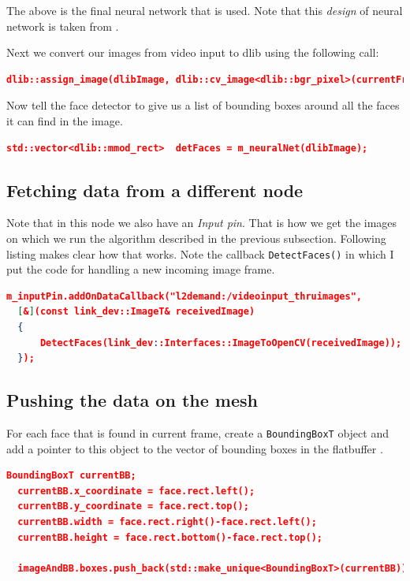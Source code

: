 \documentclass[a4paper, 12pt, oneside]{report}
\begin{document}
  The above is the final neural network that is used. Note that this \textit{design} of neural network is taken from \cite{king2015max}.
  
  Next we convert our images from video input to dlib using the following call:
  \begin{lstlisting}[language=json,firstnumber=1]
  dlib::assign_image(dlibImage, dlib::cv_image<dlib::bgr_pixel>(currentFrame));
  \end{lstlisting}
  
  Now tell the face detector to give us a list of bounding boxes
  around all the faces it can find in the image.
  \begin{lstlisting}[language=json,firstnumber=1]
  std::vector<dlib::mmod_rect>  detFaces = m_neuralNet(dlibImage);
  \end{lstlisting}
  
  \subsection{Fetching data from a different node}
  Note that in this node we also have an \textit{Input pin}. That is how we get the images on which we run the algorithm described in the previous subsection. Following listing makes clear how that works.
  Note the callback \texttt{DetectFaces()} in which I put the code for handling a new incoming image frame.
  \begin{lstlisting}[language=json,firstnumber=1]
  m_inputPin.addOnDataCallback("l2demand:/videoinput_thruimages", 
  [&](const link_dev::ImageT& receivedImage) 
  {
      DetectFaces(link_dev::Interfaces::ImageToOpenCV(receivedImage));
  });
  \end{lstlisting}

  \subsection{Pushing the data on the mesh}
  
  For each face that is found in current frame, create a \texttt{BoundingBoxT} object and 
  add a pointer to this object to the vector of bounding boxes in the flatbuffer \cite{FlatBuffersFlatBuffers-2019-06-20}.

  \begin{lstlisting}[language=json,firstnumber=1]
  BoundingBoxT currentBB;
  currentBB.x_coordinate = face.rect.left();
  currentBB.y_coordinate = face.rect.top();
  currentBB.width = face.rect.right()-face.rect.left();
  currentBB.height = face.rect.bottom()-face.rect.top();
  
  imageAndBB.boxes.push_back(std::make_unique<BoundingBoxT>(currentBB));
  \end{lstlisting}
    
\end{document}
